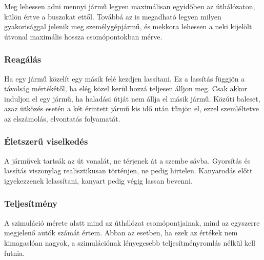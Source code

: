 Meg lehessen adni mennyi jármű legyen maximálisan egyidőben az úthálózaton, külön értve a buszokat ettől. Továbbá az is megadható legyen milyen gyakorisággal jelenik meg személygépjármű, és mekkora lehessen a neki kijelölt útvonal maximális hossza csomópontokban mérve.

\subsubsection{Reagálás}

Ha egy jármű közelít egy másik felé kezdjen lassítani. Ez a lassítás függjön a távolság mértékétől, ha elég közel kerül hozzá teljesen álljon meg. Csak akkor induljon el egy jármű, ha haladási útját nem állja el másik jármű. Közúti baleset, azaz ütközés esetén a két érintett jármű kis idő után tűnjön el, ezzel szemléltetve az elszámolás, elvontatás folyamatát.

\subsubsection{Életszerű viselkedés}

A járművek tartsák az út vonalát, ne térjenek át a szembe sávba. Gyorsítás és lassítás viszonylag realisztikusan történjen, ne pedig hirtelen. Kanyarodás előtt igyekezzenek lelassítani, kanyart pedig végig lassan bevenni.

\subsubsection{Teljesítmény}

A szimuláció mérete alatt mind az úthálózat csomópontjainak, mind az egyszerre megjelenő autók számát értem. Abban az esetben, ha ezek az értékek nem kimagaslóan nagyok, a szimulációnak lényegesebb teljesítményromlás nélkül kell futnia.
